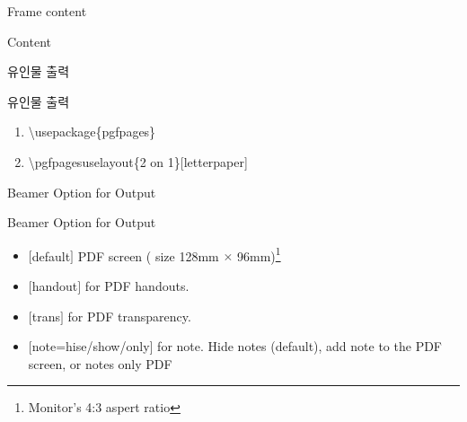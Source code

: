 \documentclass[10pt,blue,xcolor=pdftex,dvipsnames,table,handout]{beamer}
\begin{document}
		\begin{frame}[t]{Frame content}

			\begin{block} {Content}
			\end{block}

		\end{frame}




























		\begin{frame}[t]{유인물 출력}

			\begin{block} {유인물 출력}
			\begin{enumerate}
			\item[]	\textbackslash usepackage\{pgfpages\}
			\item[]	\textbackslash pgfpagesuselayout\{2 on 1\}[letterpaper]
			\end{enumerate}
			\end{block}


		\end{frame}




		\begin{frame}[t]{Beamer Option for Output}

			\begin{block} {Beamer Option for Output}
			\begin{itemize}
			\item	$[$default$]$ PDF screen ( size 128mm $\times$ 96mm)\footnote{ Monitor's 4:3 aspert ratio}
			\item	$[$handout$]$ for PDF handouts.
			\item	$[$trans$]$ for PDF transparency.
			\item	$[$note=hise/show/only$]$ for note. Hide notes (default), add note to the PDF screen, or notes only PDF
			\end{itemize}
			\end{block}


		\end{frame}
\end{document}
